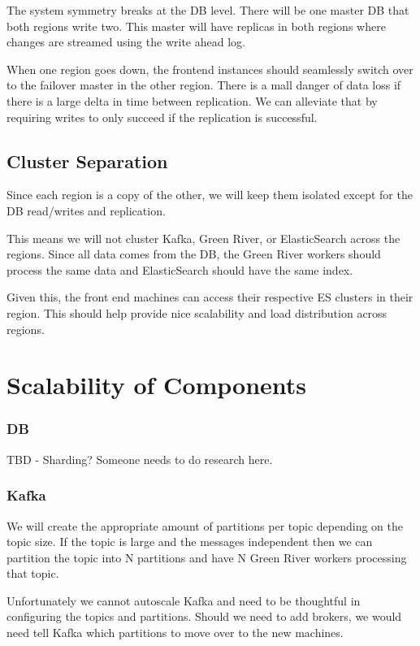 \documentclass[11pt]{article}
\begin{document}
The system symmetry breaks at the DB level. There will be one master DB that both
regions write two. This master will have replicas in both regions where changes
are streamed using the write ahead log.

When one region goes down, the frontend instances should seamlessly switch over
to the failover master in the other region. There is a mall danger of data loss if 
there is a large delta in time between replication. We can alleviate that by 
requiring writes to only succeed if the replication is successful.

\subsection{Cluster Separation}

Since each region is a copy of the other, we will keep them isolated except for
the DB read/writes and replication. 

This means we will not cluster Kafka, Green River, or ElasticSearch across the regions.
Since all data comes from the DB, the Green River workers should process the same
data and ElasticSearch should have the same index.

Given this, the front end machines can access their respective ES clusters in their 
region. This should help provide nice scalability and load distribution across regions.

\section{Scalability of Components}

\subsubsection{DB}

TBD - Sharding? Someone needs to do research here.

\subsubsection{Kafka}

We will create the appropriate amount of partitions per topic depending on the
topic size. If the topic is large and the messages independent then we can 
partition the topic into N partitions and have N Green River workers processing 
that topic.

Unfortunately we cannot autoscale Kafka and need to be thoughtful in configuring
the topics and partitions. Should we need to add brokers, we would need tell Kafka
which partitions to move over to the new machines.
\end{document}
